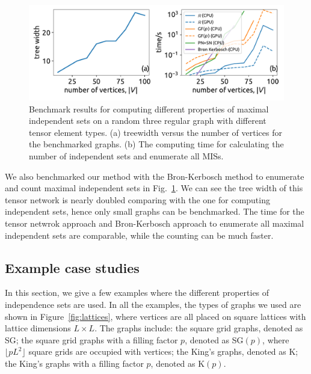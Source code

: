 \documentclass[onefignum, onetabnum]{siamart190516}
\newcommand{\<}{\langle}
\renewcommand{\>}{\rangle}
\newcommand{\Fig}[1]{Fig.~\ref{#1}}
\newcounter{example}
\begin{document}
\begin{figure} 
    \centering
    \includegraphics[width=\textwidth, trim={0cm 0cm 0cm 0cm}, clip]{figures/fig2.pdf}
    \caption{Benchmark results for computing different properties of maximal independent sets on a random three regular graph with different tensor element types.
    (a) treewidth versus the number of vertices for the benchmarked graphs. 
    (b) The computing time for calculating the number of independent sets and enumerate all MISs.
    }
    \label{fig:benchmark-maximal}
\end{figure}

We also benchmarked our method with the Bron-Kerbosch method to enumerate and count maximal independent sets in \Fig{fig:benchmark-maximal}.
We can see the tree width of this tensor network is nearly doubled comparing with the one for computing independent sets, hence only small graphs can be benchmarked.
The time for the tensor netwrok approach and Bron-Kerbosch approach to enumerate all maximal independent sets are comparable,
while the counting can be much faster.

\subsection{Example case studies} In this section, we give a few examples where the different properties of independence sets are used.
In all the examples, the types of graphs we used are shown in Figure~\ref{fig:lattices}, where vertices are all placed on square lattices with lattice dimensions $L \times L$.
The graphs include: the square grid graphs, denoted as SG; the square grid graphs with a filling factor $p$, denoted as SG$(p)$, where $\lfloor pL^{2} \rfloor$ square grids are occupied with vertices;
the King's graphs, denoted as K; the King's graphs with a filling factor $p$, denoted as K$(p)$. 
\end{document}
